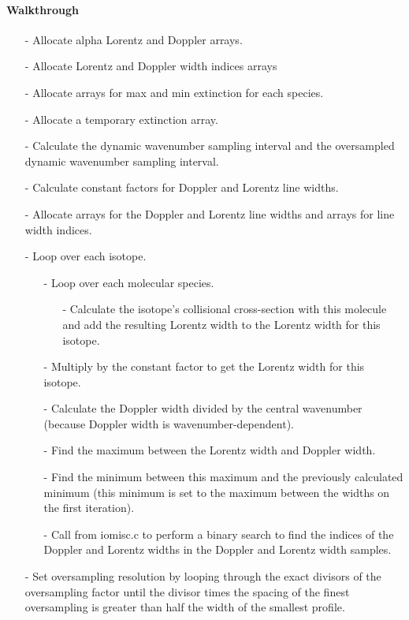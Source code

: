 \documentclass[letterpaper,12pt]{article}
\begin{document}
\paragraph{Walkthrough}
\begin{enumerate}[leftmargin=10pt, noitemsep, parsep=0pt, topsep=0ex]
\item[-] Allocate alpha Lorentz and Doppler arrays.
\item[-] Allocate Lorentz and Doppler width indices arrays
\item[-] Allocate arrays for max and min extinction for each species.
\item[-] Allocate a temporary extinction array.
\item[-] Calculate the dynamic wavenumber sampling interval and the oversampled dynamic wavenumber sampling interval.
\item[-] Calculate constant factors for Doppler and Lorentz line widths.
\item[-] Allocate arrays for the Doppler and Lorentz line widths and arrays for line width indices.
\item[-] Loop over each isotope.
\begin{enumerate}[leftmargin=10pt, noitemsep, parsep=0pt, topsep=0ex]
\item[-] Loop over each molecular species.
\begin{enumerate}[leftmargin=10pt, noitemsep, parsep=0pt, topsep=0ex]
\item[-] Calculate the isotope's collisional cross-section with this molecule and add the resulting Lorentz width to the Lorentz width for this isotope.
\end{enumerate}
\item[-] Multiply by the constant factor to get the Lorentz width for this isotope.
\item[-] Calculate the Doppler width divided by the central wavenumber (because Doppler width is wavenumber-dependent).
\item[-] Find the maximum between the Lorentz width and Doppler width.
\item[-] Find the minimum between this maximum and the previously calculated minimum (this minimum is set to the maximum between the widths on the first iteration).
\item[-] Call  from iomisc.c to perform a binary search to find the indices of the Doppler and Lorentz widths in the Doppler and Lorentz width samples.
\end{enumerate}
\item[-] Set oversampling resolution by looping through the exact divisors of the oversampling factor until the divisor times the spacing of the finest oversampling is greater than half the width of the smallest profile.

\end{enumerate}
\end{document}
